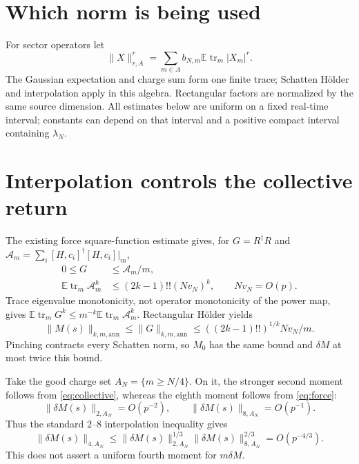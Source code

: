 \documentclass[11pt]{article}
\newcommand{\EE}{\mathbb E}
\newcommand{\tr}{\operatorname{tr}}
\begin{document}
\section{Which norm is being used}
For sector operators let
\begin{equation}
 \|X\|_{r,A}^r=\sum_{m\in A}b_{N,m}\EE\tr_m|X_m|^r.
\end{equation}
The Gaussian expectation and charge sum form one finite trace;
Schatten H\"older and interpolation apply in this algebra.
Rectangular factors are normalized by the same source dimension.
All estimates below are uniform on a fixed real-time interval;
constants can depend on that interval and a positive compact
interval containing $\lambda_N$.

\newpage
\section{Interpolation controls the collective return}
The existing force square-function estimate \cite{Return} gives,
for $G=R^\dagger R$ and $\mathcal A_m=\sum_i[H,c_i]^\dagger[H,c_i]|_m$,
\begin{align}
 0\le G&\le\mathcal A_m/m,\\
 \EE\tr_m\mathcal A_m^k&\le(2k-1)!!(Nv_N)^k,\qquad Nv_N=O(p).
 \label{eq:force}
\end{align}
Trace eigenvalue monotonicity, not operator monotonicity of the
power map, gives $\EE\tr_mG^k\le m^{-k}\EE\tr_m\mathcal A_m^k$.
Rectangular H\"older yields
\begin{equation}
 \|M(s)\|_{k,m,\mathrm{ann}}\le\|G\|_{k,m,\mathrm{ann}}
 \le ((2k-1)!!)^{1/k}Nv_N/m.
\end{equation}
Pinching contracts every Schatten norm, so $M_0$ has the same bound
and $\delta M$ at most twice this bound.

Take the good charge set $A_N=\{m\ge N/4\}$. On it, the stronger
second moment follows from \eqref{eq:collective}, whereas the
eighth moment follows from \eqref{eq:force}:
\begin{equation}
 \|\delta M(s)\|_{2,A_N}=O(p^{-2}),\qquad
 \|\delta M(s)\|_{8,A_N}=O(p^{-1}).
\end{equation}
Thus the standard $2$--$8$ interpolation inequality gives
\begin{equation}
 \|\delta M(s)\|_{4,A_N}
 \le\|\delta M(s)\|_{2,A_N}^{1/3}
       \|\delta M(s)\|_{8,A_N}^{2/3}
 =O(p^{-4/3}).\label{eq:interp}
\end{equation}
This does not assert a uniform fourth moment for $m\delta M$.
\end{document}
